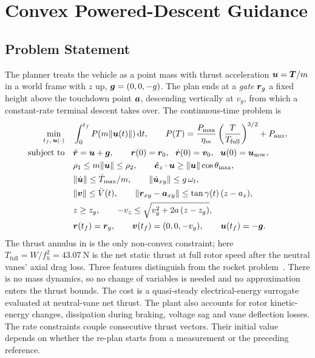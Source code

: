 \documentclass[10pt,letterpaper]{article}
\begin{document}
\section{Convex Powered-Descent Guidance}
\label{sec:guidance}

\subsection{Problem Statement}
\label{sec:problem}

The planner treats the vehicle as a point mass with thrust acceleration $\bm{u} = \bm{T}/m$ in a world frame with $z$ up, $\bm{g} = (0, 0, -g)$.
The plan ends at a \emph{gate} $\bm{r}_g$ a fixed height above the touchdown point $\bm{a}$, descending vertically at $v_g$, from which a constant-rate terminal descent takes over.
The continuous-time problem is
\begin{subequations}
\label{eq:problem}
\begin{align}
\min_{t_f,\,\vect{u}(\cdot)}\quad & \int_0^{t_f} P\!\left(m\|\vect{u}(t)\|\right)\mathrm{d}t, \qquad P(T) = \frac{P_{\max}}{\eta_m}\left(\frac{T}{T_{\text{full}}}\right)^{3/2} + P_{\text{aux}}, \label{eq:prob-cost}\\
\text{subject to}\quad & \ddot{\vect{r}} = \vect{u} + \vect{g}, \qquad \vect{r}(0) = \vect{r}_0,\ \ \dot{\vect{r}}(0) = \vect{v}_0,\ \ \vect{u}(0) = \vect{u}_{\text{now}}, \label{eq:prob-dyn}\\
& \rho_1 \le m\|\vect{u}\| \le \rho_2, \qquad \ez\cdot\vect{u} \ge \|\vect{u}\|\cos\theta_{\max}, \label{eq:prob-annulus}\\
& \|\dot{\vect{u}}\| \le \dot T_{\max}/m, \qquad \|\dot{\vect{u}}_{xy}\| \le g\,\omega_t, \label{eq:prob-rate}\\
& \|\vect{v}\| \le \bar V(t), \qquad \|\vect{r}_{xy} - \vect{a}_{xy}\| \le \tan\gamma(t)\,(z - a_z), \label{eq:prob-state}\\
& z \ge z_g, \qquad -v_z \le \sqrt{v_g^2 + 2a\,(z - z_g)}, \label{eq:prob-sink}\\
& \vect{r}(t_f) = \vect{r}_g, \qquad \vect{v}(t_f) = (0, 0, -v_g), \qquad \vect{u}(t_f) = -\vect{g}. \label{eq:prob-term}
\end{align}
\end{subequations}
The thrust annulus in  is the only non-convex constraint; here $T_{\text{full}} = W / f_h^2 = \SI{43.07}{\newton}$ is the net static thrust at full rotor speed after the neutral vanes' axial drag loss.
Three features distinguish  from the rocket problem~\cite{acikmese2007}.
There is no mass dynamics, so no change of variables is needed and no approximation enters the thrust bounds.
The cost is a quasi-steady electrical-energy surrogate evaluated at neutral-vane net thrust. The plant also accounts for rotor kinetic-energy changes, dissipation during braking, voltage sag and vane deflection losses.
The rate constraints couple consecutive thrust vectors. Their initial value depends on whether the re-plan starts from a measurement or the preceding reference.
\end{document}

